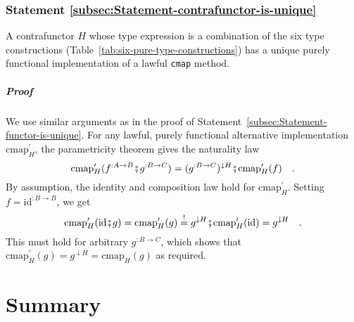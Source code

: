 \subsubsection{Statement \label{subsec:Statement-contrafunctor-is-unique}\ref{subsec:Statement-contrafunctor-is-unique}}

A contrafunctor $H$ whose type expression is a combination of the
six type constructions (Table~\ref{tab:six-pure-type-constructions})
has a unique purely functional implementation of a lawful \lstinline!cmap!
method. 

\subparagraph{Proof}

We use similar arguments as in the proof of Statement~\ref{subsec:Statement-functor-is-unique}.
For any lawful, purely functional alternative implementation $\text{cmap}_{H}^{\prime}$,
the parametricity theorem gives the naturality law
\[
\text{cmap}_{H}^{\prime}(f^{:A\rightarrow B}\bef g^{:B\rightarrow C})=(g^{:B\rightarrow C})^{\downarrow H}\bef\text{cmap}_{H}^{\prime}(f)\quad.
\]
By assumption, the identity and composition law hold for $\text{cmap}_{H}^{\prime}$.
Setting $f=\text{id}^{:B\rightarrow B}$, we get
\[
\text{cmap}_{H}^{\prime}(\text{id}\bef g)=\text{cmap}_{H}^{\prime}(g)\overset{!}{=}g^{\downarrow H}\bef\text{cmap}_{H}^{\prime}(\text{id})=g^{\downarrow H}\quad.
\]
This must hold for arbitrary $g^{:B\rightarrow C}$, which shows that
$\text{cmap}_{H}^{\prime}(g)=g^{\downarrow H}=\text{cmap}_{H}(g)$
as required.

\section{Summary}

